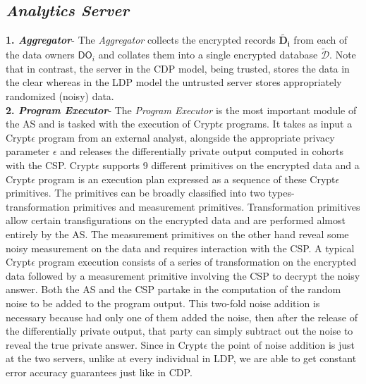 \subsection*{\textit{Analytics Server}}

\textbf{1.\textit{ Aggregator}}- The \textit{Aggregator} collects the encrypted records $\mathbf{\tilde{D_i}}$ from each of the data owners $\textsf{DO}_i$ and collates them into a single encrypted database $\boldsymbol{\tilde{\mathcal{D}}}$. Note that in contrast, the server in the \textsf{CDP} model, being trusted, stores the data in the clear whereas in the \textsf{LDP} model the untrusted server stores appropriately randomized (noisy) data.    \\\textbf{2.\textit{ Program Executor}}- The \textit{Program Executor} is the most important module of the \textsf{AS} and is tasked with the execution of Crypt$\epsilon$ programs. It takes as input a Crypt$\epsilon$ program from an external analyst, alongside the appropriate privacy parameter $\epsilon$ and releases the differentially private output computed in cohorts with the CSP. Crypt$\epsilon$ supports 9 different primitives on the encrypted data and a Crypt$\epsilon$ program is an execution plan expressed as a sequence of these Crypt$\epsilon$ primitives. The primitives can be broadly classified into two types- transformation primitives and measurement primitives. Transformation primitives allow certain transfigurations on the encrypted data and are performed almost entirely by the \textsf{AS}. The measurement primitives on the other hand reveal some noisy measurement on the data and requires interaction with the \textsf{CSP}. A typical Crypt$\epsilon$ program execution consists of  a series of transformation on the encrypted data followed by a measurement primitive involving the \textsf{CSP} to decrypt the noisy answer. Both the \textsf{AS} and the \textsf{CSP} partake in the computation of the random noise to be added to the program output. This two-fold noise addition is necessary because  had only one of them added the noise, then after the release of the differentially private output, that party can simply subtract out the noise to reveal the true private answer. Since in Crypt$\epsilon$ the point of noise addition is just at the two servers, unlike at every individual in LDP, we are able to get constant error accuracy guarantees just like in CDP. 
